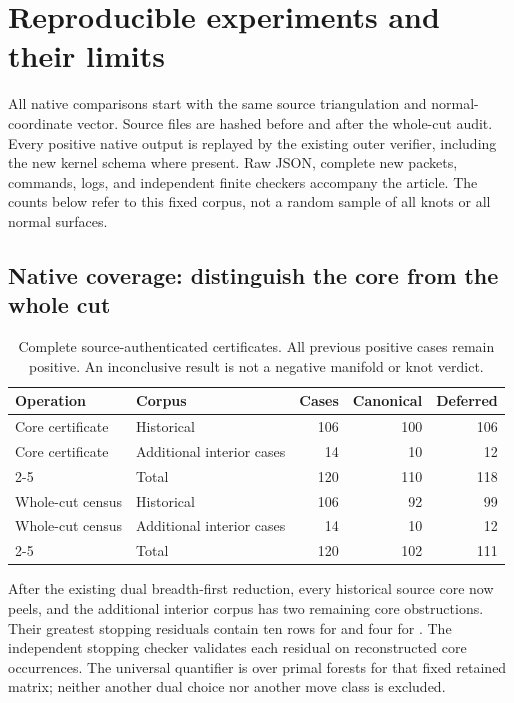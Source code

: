 \section{Reproducible experiments and their limits}
\label{sec:experiments}

All native comparisons start with the same source triangulation and
normal-coordinate vector.  Source files are hashed before and after the
whole-cut audit.  Every positive native output is replayed by the
existing outer verifier, including the new kernel schema where present.
Raw JSON, complete new packets, commands, logs, and independent finite
checkers accompany the article.  The counts below refer to this fixed
corpus, not a random sample of all knots or all normal surfaces.

\subsection{Native coverage: distinguish the core from the whole cut}

\begin{table}[htbp]
\centering
\begin{tabular}{llrrr}
\toprule
Operation & Corpus & Cases & Canonical & Deferred\\
\midrule
Core certificate & Historical & 106 & 100 & 106\\
Core certificate & Additional interior cases & 14 & 10 & 12\\
\cmidrule(lr){2-5}
& Total & 120 & 110 & 118\\
\midrule
Whole-cut census & Historical & 106 & 92 & 99\\
Whole-cut census & Additional interior cases & 14 & 10 & 12\\
\cmidrule(lr){2-5}
& Total & 120 & 102 & 111\\
\bottomrule
\end{tabular}
\caption{Complete source-authenticated certificates.  All previous
positive cases remain positive.  An inconclusive result is not a
negative manifold or knot verdict.}
\label{tab:coverage}
\end{table}

After the existing dual breadth-first reduction, every historical source
core now peels, and the additional interior corpus has two remaining
core obstructions.  Their greatest stopping residuals contain ten rows
for  and four for
.  The independent stopping checker
validates each residual on reconstructed core occurrences.  The
universal quantifier is over primal forests for that fixed retained
matrix; neither another dual choice nor another move class is excluded.

